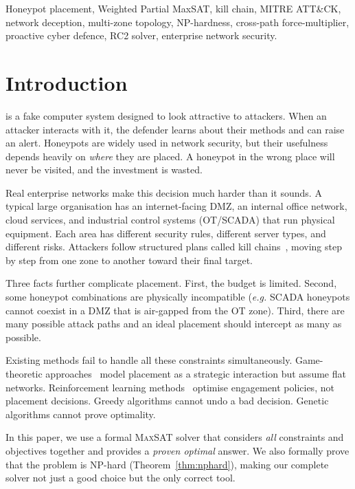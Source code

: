 \documentclass[journal]{IEEEtran}
\newcommand{\eg}{\emph{e.g.}}
\newcommand{\maxsat}{\textsc{MaxSAT}}
\begin{document}
\begin{IEEEkeywords}
Honeypot placement, Weighted Partial MaxSAT, kill chain,
MITRE ATT\&CK, network deception, multi-zone topology,
NP-hardness, cross-path force-multiplier, proactive cyber
defence, RC2 solver, enterprise network security.
\end{IEEEkeywords}

\section{Introduction}
\label{sec:intro}

 is a fake computer system
designed to look attractive to attackers.
When an attacker interacts with it, the defender learns about
their methods and can raise an alert.
Honeypots are widely used in network security, but their
usefulness depends heavily on \emph{where} they are placed.
A honeypot in the wrong place will never be visited, and the
investment is wasted.

Real enterprise networks make this decision much harder than
it sounds.
A typical large organisation has an internet-facing DMZ,
an internal office network, cloud services, and industrial
control systems (OT/SCADA) that run physical equipment.
Each area has different security rules, different server
types, and different risks.
Attackers follow structured plans called kill
chains~\cite{hutchins2011}, moving step by step from one
zone to another toward their final target.

Three facts further complicate placement.
First, the budget is limited.
Second, some honeypot combinations are physically
incompatible (\eg{} SCADA honeypots cannot coexist in a
DMZ that is air-gapped from the OT zone).
Third, there are many possible attack paths and an ideal
placement should intercept as many as possible.

Existing methods fail to handle all these constraints
simultaneously.
Game-theoretic approaches~\cite{kiekintveld2015,pawlick2019}
model placement as a strategic interaction but assume flat
networks.
Reinforcement learning methods~\cite{huang2019} optimise
engagement policies, not placement decisions.
Greedy algorithms cannot undo a bad decision.
Genetic algorithms cannot prove optimality.

In this paper, we use a formal \maxsat{} solver that
considers \emph{all} constraints and objectives together
and provides a \emph{proven optimal} answer.
We also formally prove that the problem is NP-hard
(Theorem~\ref{thm:nphard}), making our complete solver not
just a good choice but the only correct tool.
\end{document}
